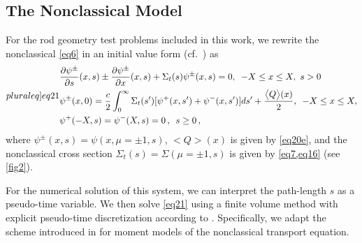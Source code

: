 \documentclass[12pt]{article}
\newcommand{\bl}{\big<}
\newcommand{\bg}{\big>}
\begin{document}
{\subsection{The Nonclassical Model}

For the rod geometry test problems included in this work, we rewrite the nonclassical \cref{eq6} in an initial value form (cf.\ \cite{vaslar14a}) as
\begin{subequations}\label[pluraleq]{eq21}
\begin{align}
&\frac{\partial\psi^{\pm}}{\partial s}(x,s) \pm \frac{\partial \psi^{\pm}}{\partial x}(x,s) + \Sigma_t(s)\psi^{\pm}(x,s)  = 0,\,\,\, -X\leq x\leq X,\,\, s>0 \label{eq21a}\\
& \psi^{\pm}(x,0)= \frac{c}{2} \int_0^\infty \Sigma_t(s')[\psi^{+}(x,s')+\psi^{-}(x,s')]ds' + \frac{\bl Q\bg(x)}{2}, \,\,\, -X\leq x\leq X,\label{eq21b}\\
& \psi^+(-X,s) = \psi^-(X,s) = 0\,,\,\,\, s\geq 0\,,
\end{align}
\end{subequations}
where $\psi^{\pm}(x,s) = \psi(x,\mu=\pm 1, s)$, $\bl Q\bg(x)$ is given by \cref{eq20e}, and the nonclassical cross section $\Sigma_t(s)=\Sigma(\mu=\pm 1,s)$ is given by \cref{eq7,eq16} (see \cref{fig2}).

For the numerical solution of this system, we can interpret the path-length $s$ as a pseudo-time variable.
We then solve \cref{eq21} using a finite volume method with explicit pseudo-time discretization according to \cite{hll83}.
Specifically, we adapt the scheme introduced in \cite{kry13} for moment models of the nonclassical transport equation.

}
\end{document}
